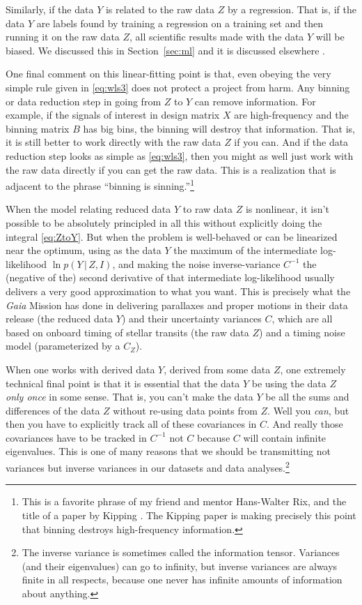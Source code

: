 \documentclass{article}
\newcommand{\sectionname}{Section}
\newcommand{\secref}[1]{\sectionname~\ref{#1}}
\newcommand{\given}{\,|\,}
\begin{document}
Similarly, if the data $Y$ is related to the raw data $Z$ by a regression.
That is, if the data $Y$ are labels found by training a regression on a training set and then running it on the raw data $Z$, all scientific results made with the data $Y$ will be biased.
We discussed this in \secref{sec:ml} and it is discussed elsewhere \cite{goodorbad, ting}.

One final comment on this linear-fitting point is that, even obeying the very simple rule given in \eqref{eq:wls3} does not protect a project from harm.
Any binning or data reduction step in going from $Z$ to $Y$ can remove information.
For example, if the signals of interest in design matrix $X$ are high-frequency and the binning matrix $B$ has big bins, the binning will destroy that information.
That is, it is still better to work directly with the raw data $Z$ if you can.
And if the data reduction step looks as simple as \eqref{eq:wls3}, then you might as well just work with the raw data directly if you can get the raw data.
This is a realization that is adjacent to the phrase ``binning is sinning.''\footnote{This is a favorite phrase of my friend and mentor Hans-Walter Rix, and the title of a paper by Kipping \cite{binningissinning}. The Kipping paper is making precisely this point that binning destroys high-frequency information.}

When the model relating reduced data $Y$ to raw data $Z$ is nonlinear, it isn't possible to be absolutely principled in all this without explicitly doing the integral \eqref{eq:ZtoY}.
But when the problem is well-behaved or can be linearized near the optimum, using as the data $Y$ the maximum of the intermediate log-likelihood $\ln p(Y\given Z,I)$, and making the noise inverse-variance $C^{-1}$ the (negative of the) second derivative of that intermediate log-likelihood usually delivers a very good approximation to what you want.
This is precisely what the \textsl{Gaia} Mission \cite{gaia} has done in delivering parallaxes and proper motions in their data release \cite{gaiadr3} (the reduced data $Y$) and their uncertainty variances $C$, which are all based on onboard timing of stellar transits (the raw data $Z$) and a timing noise model (parameterized by a $C_Z$).

When one works with derived data $Y$, derived from some data $Z$, one extremely technical final point is that it is essential that the data $Y$ be using the data $Z$ \emph{only once} in some sense.
That is, you can't make the data $Y$ be all the sums and differences of the data $Z$ without re-using data points from $Z$.
Well you \emph{can}, but then you have to explicitly track all of these covariances in $C$.
And really those covariances have to be tracked in $C^{-1}$ not $C$ because $C$ will contain infinite eigenvalues.
This is one of many reasons that we should be transmitting not variances but inverse variances in our datasets and data analyses.\footnote{The inverse variance is sometimes called the information tensor. Variances (and their eigenvalues) can go to infinity, but inverse variances are always finite in all respects, because one never has infinite amounts of information about anything.}
\end{document}
